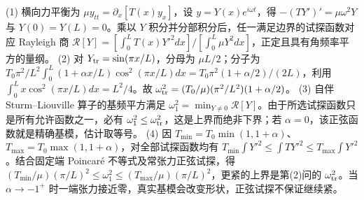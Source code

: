 (1) 横向力平衡为 \(\mu y_{tt}=\partial_x[T(x)y_x]\)，设 \(y=Y(x)e^{i\omega t}\)，得 \(-(TY')'=\mu\omega^2Y\) 与 \(Y(0)=Y(L)=0\)。乘以 \(Y\) 积分并分部积分后，任一满足边界的试探函数对应 Rayleigh 商 \(\mathcal R[Y]=[\int_0^L T(x)Y'^2dx]/[\int_0^L\mu Y^2dx]\)，正定且具有角频率平方的量纲。
(2) 对 \(Y_{\rm tr}=\sin(\pi x/L)\)，分母为 \(\mu L/2\)；分子为 \(T_0\pi^2/L^2\int_0^L(1+\alpha x/L)\cos^2(\pi x/L)dx=T_0\pi^2(1+\alpha/2)/(2L)\)，利用 \(\int_0^L x\cos^2(\pi x/L)dx=L^2/4\)。故 \(\omega_{\rm tr}^2=(T_0/\mu)(\pi^2/L^2)(1+\alpha/2)\)。
(3) 自伴 Sturm–Liouville 算子的基频平方满足 \(\omega_1^2=\min_{Y\ne0}\mathcal R[Y]\)。由于所选试探函数只是所有允许函数之一，必有 \(\omega_1^2\le\omega_{\rm tr}^2\)，这是上界而绝非下界；若 \(\alpha=0\)，该正弦函数就是精确基模，估计取等号。
(4) 因 \(T_{\min}=T_0\min(1,1+\alpha)\)、\(T_{\max}=T_0\max(1,1+\alpha)\)，对全部试探函数均有 \(T_{\min}\int Y'^2\le\int TY'^2\le T_{\max}\int Y'^2\)。结合固定端 Poincaré 不等式及常张力正弦试探，得 \((T_{\min}/\mu)(\pi/L)^2\le\omega_1^2\le(T_{\max}/\mu)(\pi/L)^2\)，更紧的上界是第(2)问的 \(\omega_{\rm tr}^2\)。当 \(\alpha\to-1^+\) 时一端张力接近零，真实基模会改变形状，正弦试探不保证继续紧。
